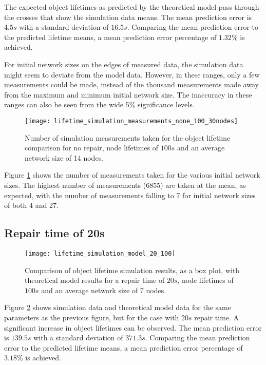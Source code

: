 The expected object lifetimes as predicted by the theoretical model pass through the crosses that show the simulation data means. The mean prediction error is $4.5s$ with a standard deviation of $16.5s$. Comparing the mean prediction error to the predicted lifetime means, a mean prediction error percentage of $1.32\%$ is achieved.

For initial network sizes on the edges of measured data, the simulation data might seem to deviate from the model data. However, in these ranges, only a few measurements could be made, instead of the thousand measurements made away from the maximum and minimum initial network size. The inaccuracy in these ranges can also be seen from the wide 5\% significance levels.

\begin{figure}[htbp]
 \centering
 \texttt{[image: lifetime\_simulation\_measurements\_none\_100\_30nodes]}
 \caption{Number of simulation measurements taken for the object lifetime comparison for no repair, node lifetimes of $100s$ and an average network size of 14 nodes.}
 \label{fig_lifetime_simulation_measurements_30_100}
\end{figure}
%
Figure \ref{fig_lifetime_simulation_measurements_30_100} shows the number of measurements taken for the various initial network sizes. The highest number of measurements (6855) are taken at the mean, as expected, with the number of measurements falling to 7 for initial network sizes of both 4 and 27.

\subsection{Repair time of 20s}

\begin{figure}[htbp]
 \centering
 \texttt{[image: lifetime\_simulation\_model\_20\_100]}
 \caption{Comparison of object lifetime simulation results, as a box plot, with theoretical model results for a repair time of $20s$, node lifetimes of $100s$ and an average network size of 7 nodes.}
 \label{fig_lifetime_simulation_model_20_100}
\end{figure}
%
Figure \ref{fig_lifetime_simulation_model_20_100} shows simulation data and theoretical model data for the same parameters as the previous figure, but for the case with $20s$ repair time. A significant increase in object lifetimes can be observed. The mean prediction error is $139.5s$ with a standard deviation of $371.3s$. Comparing the mean prediction error to the predicted lifetime means, a mean prediction error percentage of $3.18\%$ is achieved.

